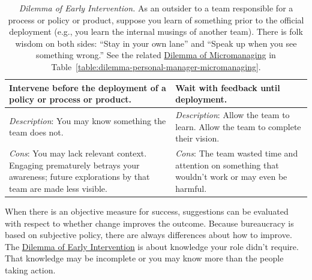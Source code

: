 \begin{center}
\begin{table}[H] %
\begin{tabular}{ | m{\dilemmatablewidth}| m{\dilemmatablewidth} | } 
  \hline
  \textbf{Intervene before the deployment of a policy or process or product.} &
  \textbf{Wait with feedback until deployment.} \\
  \hline
  \textit{Description}: You may know something the team does not. & 
  \textit{Description}: Allow the team to learn. Allow the team to complete their vision. \\
  \hline
  \textit{Cons}: You may lack relevant context. Engaging prematurely betrays your awareness; future explorations by that team are made less visible. & 
  \textit{Cons}: The team wasted time and attention on something that wouldn't work or may even be harmful. \\
  \hline
\end{tabular}
\caption{
\textit{Dilemma of Early Intervention.}
As an outsider to a team responsible for a process or policy or product, suppose you learn of something prior to the official deployment (e.g., you learn the internal musings of another team). There is folk wisdom on both sides: 
``Stay in your own lane'' 
and 
``Speak up when you see something wrong.''
See the related \hyperref[table:dilemma-personal-manager-micromanaging]{Dilemma of Micromanaging} in Table~\ref{table:dilemma-personal-manager-micromanaging}.}
\label{table:dilemma-personal-early-intervention}
\end{table}
\end{center}

When there is an objective measure for success, suggestions can be evaluated with respect to whether change improves the outcome. Because bureaucracy is based on subjective policy, there are always differences about how to improve. The \hyperref[table:dilemma-personal-early-intervention]{Dilemma of Early Intervention} is about knowledge your role didn't require. That knowledge may be incomplete or you may know more than the people taking action. 


